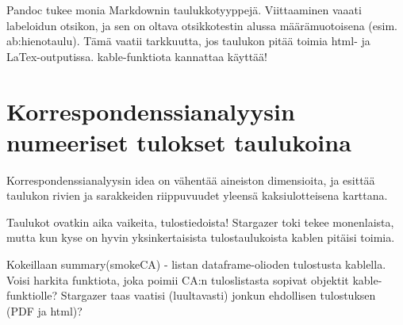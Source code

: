 \documentclass[finnish,]{book}
\newenvironment{Shaded}{\begin{snugshade}}{\end{snugshade}}
\newcommand{\CommentTok}[1]{\textcolor[rgb]{0.56,0.35,0.01}{\textit{#1}}}
\newcommand{\DataTypeTok}[1]{\textcolor[rgb]{0.13,0.29,0.53}{#1}}
\newcommand{\DecValTok}[1]{\textcolor[rgb]{0.00,0.00,0.81}{#1}}
\newcommand{\KeywordTok}[1]{\textcolor[rgb]{0.13,0.29,0.53}{\textbf{#1}}}
\newcommand{\NormalTok}[1]{#1}
\newcommand{\OperatorTok}[1]{\textcolor[rgb]{0.81,0.36,0.00}{\textbf{#1}}}
\newcommand{\OtherTok}[1]{\textcolor[rgb]{0.56,0.35,0.01}{#1}}
\newcommand{\StringTok}[1]{\textcolor[rgb]{0.31,0.60,0.02}{#1}}
\theoremstyle{definition}
\theoremstyle{definition}
\theoremstyle{definition}
\theoremstyle{remark}
\begin{document}
Pandoc tukee monia Markdownin taulukkotyyppejä. Viittaaminen vaaati
labeloidun otsikon, ja sen on oltava otsikkotestin alussa
määrämuotoisena (esim. ab:hienotaulu). Tämä vaatii tarkkuutta, jos
taulukon pitää toimia html- ja LaTex-outputissa. kable-funktiota
kannattaa käyttää!

\hypertarget{korrespondenssianalyysin-numeeriset-tulokset-taulukoina}{%
\section{Korrespondenssianalyysin numeeriset tulokset
taulukoina}\label{korrespondenssianalyysin-numeeriset-tulokset-taulukoina}}

Korrespondenssianalyysin idea on vähentää aineiston dimensioita, ja
esittää taulukon rivien ja sarakkeiden riippuvuudet yleensä
kaksiulotteisena karttana.

\begin{Shaded}
\end{Shaded}

Taulukot ovatkin aika vaikeita, tulostiedoista! Stargazer toki tekee
monenlaista, mutta kun kyse on hyvin yksinkertaisista tulostaulukoista
kablen pitäisi toimia.

Kokeillaan summary(smokeCA) - listan dataframe-olioden tulostusta
kablella. Voisi harkita funktiota, joka poimii CA:n tuloslistasta
sopivat objektit kable-funktiolle? Stargazer taas vaatisi (luultavasti)
jonkun ehdollisen tulostuksen (PDF ja html)?

\begin{Shaded}
\end{Shaded}
\end{document}
